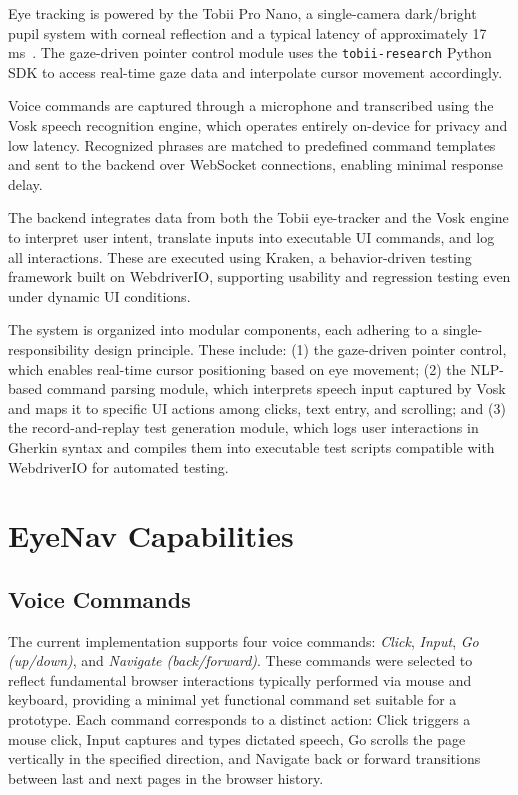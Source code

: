 Eye tracking is powered by the Tobii Pro Nano, a single-camera dark/bright pupil system with corneal reflection and a typical latency of approximately 17 ms~. The gaze-driven pointer control module uses the \verb|tobii-research| Python SDK to access real-time gaze data and interpolate cursor movement accordingly.

Voice commands are captured through a microphone and transcribed using the Vosk speech recognition engine, which operates entirely on-device for privacy and low latency. Recognized phrases are matched to predefined command templates and sent to the backend over WebSocket connections, enabling minimal response delay.

The backend integrates data from both the Tobii eye-tracker and the Vosk engine to interpret user intent, translate inputs into executable UI commands, and log all interactions. These are executed using Kraken, a behavior-driven testing framework built on WebdriverIO, supporting usability and regression testing even under dynamic UI conditions.

The system is organized into modular components, each adhering to a single-responsibility design principle. These include: (1) the gaze-driven pointer control, which enables real-time cursor positioning based on eye movement; (2) the NLP-based command parsing module, which interprets speech input captured by Vosk and maps it to specific UI actions among clicks, text entry, and scrolling; and (3) the record-and-replay test generation module, which logs user interactions in Gherkin syntax and compiles them into executable test scripts compatible with WebdriverIO for automated testing.

\section{EyeNav Capabilities}
\subsection{Voice Commands}

The current implementation supports four voice commands: \textit{Click}, \textit{Input}, \textit{Go (up/down)}, and \textit{Navigate (back/forward)}. These commands were selected to reflect fundamental browser interactions typically performed via mouse and keyboard, providing a minimal yet functional command set suitable for a prototype. Each command corresponds to a distinct action: Click triggers a mouse click, Input captures and types dictated speech, Go scrolls the page vertically in the specified direction, and Navigate back or forward transitions between last and next pages in the browser history.

